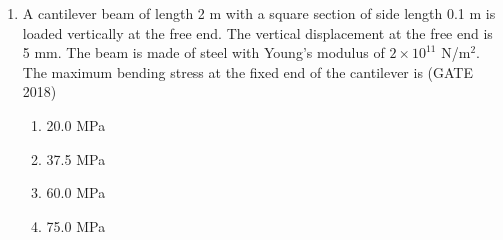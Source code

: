 \documentclass[journal,12pt,onecolumn]{IEEEtran}
\theoremstyle{remark}
\begin{document}
\begin{enumerate}
\item A cantilever beam of length 2 m with a square section of side length 0.1 m is loaded vertically at the free end. The vertical displacement at the free end is 5 mm. The beam is made of steel with Young's modulus of $2\times10^{11}$ N/m$^2$. The maximum bending stress at the fixed end of the cantilever is
\hfill{(GATE 2018)}
\begin{multicols}{4}
\begin{enumerate}
    \item 20.0 MPa
    \item 37.5 MPa
    \item 60.0 MPa
    \item 75.0 MPa
\end{enumerate}
\end{multicols}
\vspace{1cm}


\end{enumerate}
\end{document}
